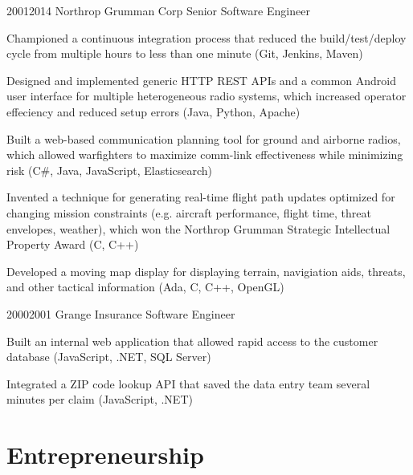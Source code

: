 \documentclass{article}
\begin{document}
\job
  {2001}{2014}
  {Northrop Grumman Corp}
  {Senior Software Engineer}
  {\begin{achievements}
    \item Championed a continuous integration process that reduced the build/test/deploy cycle from multiple hours to less than one minute (Git, Jenkins, Maven)
    \item Designed and implemented generic HTTP REST APIs and a common Android user interface for multiple heterogeneous radio systems, which increased operator effeciency and reduced setup errors (Java, Python, Apache)
    \item Built a web-based communication planning tool for ground and airborne radios, which allowed warfighters to maximize comm-link effectiveness while minimizing risk (C\#, Java, JavaScript, Elasticsearch)
    \item Invented a technique for generating real-time flight path updates optimized for changing mission constraints (e.g. aircraft performance, flight time, threat envelopes, weather), which won the Northrop Grumman Strategic Intellectual Property Award (C, C++)
    \item Developed a moving map display for displaying terrain, navigiation aids, threats, and other tactical information (Ada, C, C++, OpenGL)
  \end{achievements}}

\job
  {2000}{2001}
  {Grange Insurance}
  {Software Engineer}
  {\begin{achievements}
    \item Built an internal web application that allowed rapid access to the customer database (JavaScript, .NET, SQL Server)
    \item Integrated a ZIP code lookup API that saved the data entry team several minutes per claim (JavaScript, .NET)
  \end{achievements}}


\pagebreak


\section{Entrepreneurship}
\end{document}
